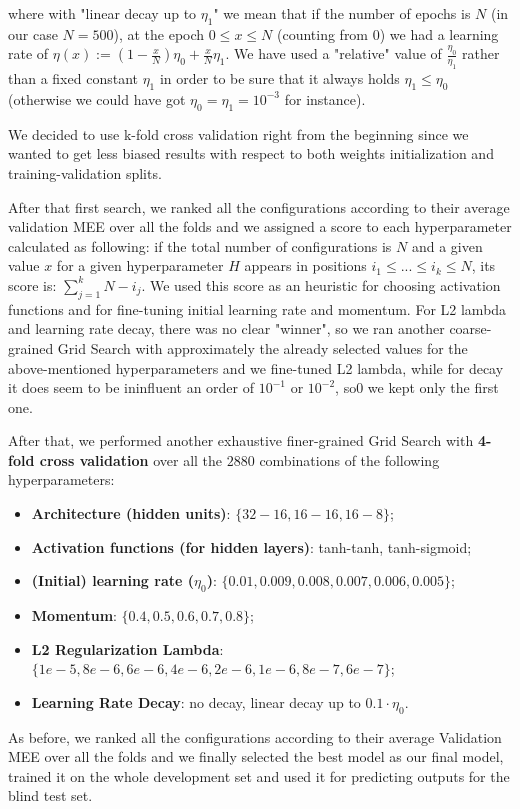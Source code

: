 where with "linear decay up to $\eta_1$" we mean that if the number of epochs is $N$ (in our case $N = 500$), at the epoch $0 \leq x \le N$ (counting from $0$) we had a learning rate of $\eta(x) := \left(1 - \frac{x}{N}\right)\eta_0 + \frac{x}{N} \eta_1$. We have used a "relative" value of $\frac{\eta_0}{\eta_1}$ rather than a fixed constant $\eta_1$ in order to be sure that it always holds $\eta_1 \leq \eta_0$ (otherwise we could have got $\eta_0 = \eta_1 = 10^{-3}$ for instance).

We decided to use k-fold cross validation right from the beginning since we wanted to get less biased results with respect to both weights initialization and training-validation splits.

After that first search, we ranked all the configurations according to their average validation MEE over all the folds and we assigned a score to each hyperparameter calculated as following: if the total number of configurations is $N$ and a given value $x$ for a given hyperparameter $H$ appears in positions $i_1 \leq ... \leq i_k \leq N$, its score is: $\sum_{j=1}^{k}{N - i_j}$. We used this score as an heuristic for choosing activation functions and for fine-tuning initial learning rate and momentum. For L2 lambda and learning rate decay, there was no clear "winner", so we ran another coarse-grained Grid Search with approximately the already selected values for the above-mentioned hyperparameters and we fine-tuned L2 lambda, while for decay it does seem to be ininfluent an order of $10^{-1}$ or $10^{-2}$, so0 we kept only the first one.

After that, we performed another exhaustive finer-grained Grid Search with \textbf{4-fold cross validation} over all the $2880$ combinations of the following hyperparameters:
\begin{itemize}
    \item \textbf{Architecture (hidden units)}: $\{32-16, 16-16, 16-8\}$;
    \item \textbf{Activation functions (for hidden layers)}: {tanh-tanh, tanh-sigmoid};
    \item \textbf{(Initial) learning rate ($\eta_0$)}: $\{0.01, 0.009, 0.008, 0.007, 0.006, 0.005\}$;
    \item \textbf{Momentum}: $\{0.4, 0.5, 0.6, 0.7, 0.8\}$;
    \item \textbf{L2 Regularization Lambda}: $\{1e-5, 8e-6, 6e-6, 4e-6, 2e-6, 1e-6, 8e-7, 6e-7\}$;
    \item \textbf{Learning Rate Decay}: {no decay, linear decay up to $0.1 \cdot \eta_0$}.
\end{itemize}
As before, we ranked all the configurations according to their average Validation MEE over all the folds and we finally selected the best model as our final model, trained it on the whole development set and used it for predicting outputs for the blind test set.

